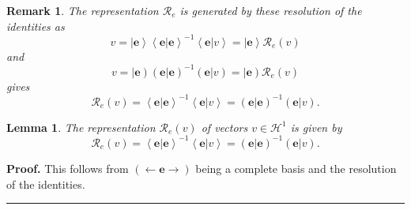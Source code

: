 \documentclass[aps,preprint]{revtex4}%
\newtheorem{lemma}[theorem]{Lemma}
\newtheorem{remark}[theorem]{Remark}
\newenvironment{proof}[1][Proof]{\noindent\textbf{#1.} }{\ \rule{0.5em}{0.5em}}
\begin{document}
\begin{remark}
The representation $\mathcal{R}_{e}$ is generated by these resolution of the
identities as
\begin{equation}
v=\left\vert \mathbf{e}\right\rangle \left\langle \left.  \mathbf{e}%
\right\vert \mathbf{e}\right\rangle ^{-1}\left\langle \left.  \mathbf{e}%
\right\vert v\right\rangle =\left\vert \mathbf{e}\right\rangle \mathcal{R}%
_{e}\left(  v\right)
\end{equation}
and%
\begin{equation}
v=\left\vert \mathbf{e}\right)  \left(  \left.  \mathbf{e}\right\vert
\mathbf{e}\right)  ^{-1}\left(  \left.  \mathbf{e}\right\vert v\right)
=\left\vert \mathbf{e}\right)  \mathcal{R}_{e}\left(  v\right)
\end{equation}
gives
\begin{equation}
\mathcal{R}_{e}\left(  v\right)  =\left\langle \left.  \mathbf{e}\right\vert
\mathbf{e}\right\rangle ^{-1}\left\langle \left.  \mathbf{e}\right\vert
v\right\rangle =\left(  \left.  \mathbf{e}\right\vert \mathbf{e}\right)
^{-1}\left(  \left.  \mathbf{e}\right\vert v\right)  .
\end{equation}

\end{remark}

\begin{lemma}
The representation $\mathcal{R}_{e}\left(  v\right)  $ of vectors
$v\in\mathcal{H}^{1}$ is given by
\begin{equation}
\mathcal{R}_{e}\left(  v\right)  =\left\langle \left.  \mathbf{e}\right\vert
\mathbf{e}\right\rangle ^{-1}\left\langle \left.  \mathbf{e}\right\vert
v\right\rangle =\left(  \left.  \mathbf{e}\right\vert \mathbf{e}\right)
^{-1}\left(  \left.  \mathbf{e}\right\vert v\right)  .
\end{equation}

\end{lemma}

\begin{proof}
This follows from $\left(  \longleftarrow\mathbf{e\rightarrow}\right)  $ being
a complete basis and the resolution of the identities.
\end{proof}
\end{document}
